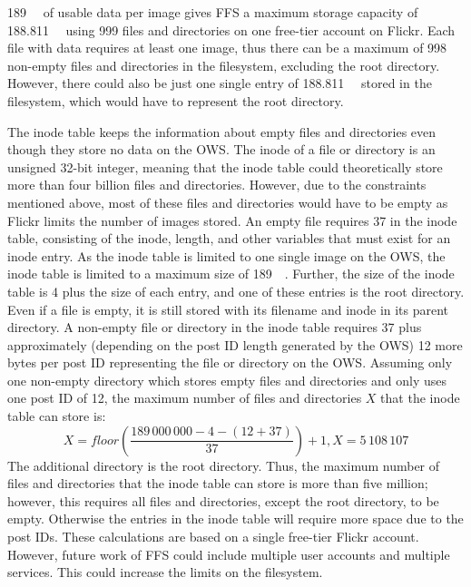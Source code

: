 \SI{189}{\mega\byte} of usable data per image gives \gls{FFS} a maximum storage capacity of \SI{188.811}{\giga\byte} using 999 files and directories on one \mbox{free-tier} account on Flickr. Each file with data requires at least one image, thus there can be a maximum of 998 \mbox{non-empty} files and directories in the filesystem, excluding the root directory. However, there could also be just one single entry of \SI{188.811}{\giga\byte} stored in the filesystem, which would have to represent the root directory.

The inode table keeps the information about empty files and directories even though they store no data on the \gls{OWS}. The inode of a file or directory is an unsigned \mbox{32-bit} integer, meaning that the inode table could theoretically store more than four billion files and directories. However, due to the constraints mentioned above, most of these files and directories would have to be empty as Flickr limits the number of images stored. An empty file requires \SI{37}{\byte} in the inode table, consisting of the inode, length, and other variables that must exist for an inode entry. As the inode table is limited to one single image on the \gls{OWS}, the inode table is limited to a maximum size of \SI{189}{\mega\byte}. Further, the size of the inode table is \SI{4}{\byte} plus the size of each entry, and one of these entries is the root directory. Even if a file is empty, it is still stored with its filename and inode in its parent directory. A \mbox{non-empty} file or directory in the inode table requires \SI{37}{\byte} plus approximately (depending on the post ID length generated by the \gls{OWS}) 12 more bytes per post ID representing the file or directory on the \gls{OWS}. Assuming only one \mbox{non-empty} directory which stores empty files and directories and only uses one post ID of \SI{12}{\byte}, the maximum number of files and directories $X$ that the inode table can store is:
$$
	X = floor(\frac{189\,000\,000 - 4 - (12 + 37)}{37}) + 1, X = 5\,108\,107
$$
The additional directory is the root directory. Thus, the maximum number of files and directories that the inode table can store is more than five million; however, this requires all files and directories, except the root directory, to be empty. Otherwise the entries in the inode table will require more space due to the post IDs. These calculations are based on a single \mbox{free-tier} Flickr account. However, future work of \gls{FFS} could include multiple user accounts and multiple services. This could increase the limits on the filesystem.

